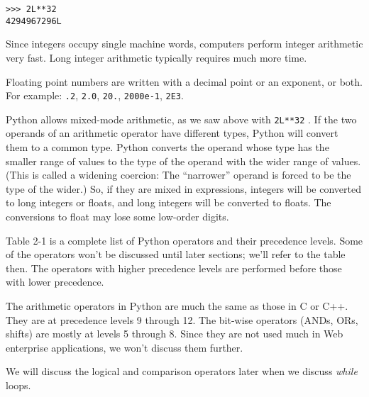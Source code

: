\begin{verbatim}
>>> 2L**32
4294967296L
\end{verbatim}


Since integers occupy single
machine words, computers perform integer arithmetic very fast. Long
integer arithmetic typically requires much more time.

Floating point numbers are written
with a decimal point or an exponent, or both. For example: \texttt{.2},
\texttt{2.0}, \texttt{20.}, \texttt{2000e-1}, \texttt{2E3}.

Python allows mixed-mode
arithmetic, as we saw above with \texttt{2L**32} . If the two operands of
an arithmetic operator have different types, Python will convert them to
a common type. Python converts the operand whose type has the smaller
range of values to the type of the operand with the wider range of
values. (This is called a widening coercion: The ``narrower'' operand is
forced to be the type of the wider.) So, if they are mixed in
expressions, integers will be converted to long integers or floats, and
long integers will be converted to floats. The conversions to float may
lose some low-order digits.


Table 2-1 is a complete list of
Python operators and their precedence levels. Some of the operators
won't be discussed until later sections; we'll refer to the table then.
The operators with higher precedence levels are performed before those
with lower precedence.

The arithmetic operators in Python
are much the same as those in C or C++. They are at precedence levels 9
through 12. The bit-wise operators (ANDs, ORs, shifts) are mostly at
levels 5 through 8. Since they are not used much in Web enterprise
applications, we won't discuss them further.

We will discuss the logical and
comparison operators later when we discuss \emph{while} loops.

